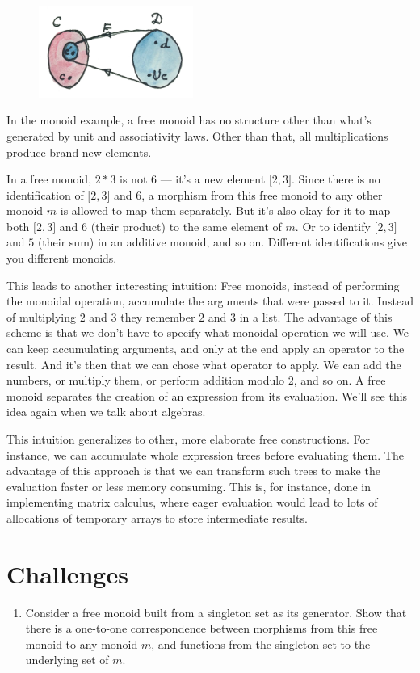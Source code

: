 \begin{figure}[H]
  \centering
  \includegraphics[width=0.45\textwidth]{images/freeimage.jpg}
\end{figure}

\noindent
In the monoid example, a free monoid has no structure other than what's
generated by unit and associativity laws. Other than that, all
multiplications produce brand new elements.

In a free monoid, $2 * 3$ is not $6$ --- it's a new element ${[}2, 3{]}$. Since
there is no identification of ${[}2, 3{]}$ and $6$, a morphism from this
free monoid to any other monoid $m$ is allowed to map them
separately. But it's also okay for it to map both ${[}2, 3{]}$ and $6$
(their product) to the same element of $m$. Or to identify ${[}2,
  3{]}$ and $5$ (their sum) in an additive monoid, and so on. Different
identifications give you different monoids.

This leads to another interesting intuition: Free monoids, instead of
performing the monoidal operation, accumulate the arguments that were
passed to it. Instead of multiplying $2$ and $3$ they remember $2$ and $3$ in a
list. The advantage of this scheme is that we don't have to specify what
monoidal operation we will use. We can keep accumulating arguments, and
only at the end apply an operator to the result. And it's then that we
can chose what operator to apply. We can add the numbers, or multiply
them, or perform addition modulo 2, and so on. A free monoid separates
the creation of an expression from its evaluation. We'll see this idea
again when we talk about algebras.

This intuition generalizes to other, more elaborate free constructions.
For instance, we can accumulate whole expression trees before evaluating
them. The advantage of this approach is that we can transform such trees
to make the evaluation faster or less memory consuming. This is, for
instance, done in implementing matrix calculus, where eager evaluation
would lead to lots of allocations of temporary arrays to store
intermediate results.

\section{Challenges}

\begin{enumerate}
  \tightlist
  \item
        Consider a free monoid built from a singleton set as its generator.
        Show that there is a one-to-one correspondence between morphisms from
        this free monoid to any monoid $m$, and functions from the
        singleton set to the underlying set of $m$.
\end{enumerate}
